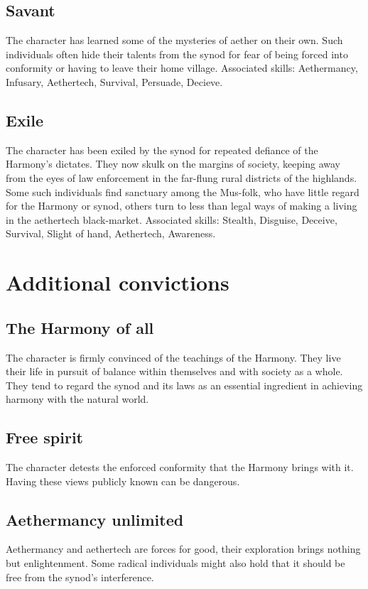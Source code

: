 \documentclass[a4paper,11pt,oneside]{book}
\begin{document}
\subsection{Savant}
The character has learned some of the mysteries of aether on their own. Such individuals often hide their talents from the synod for fear of being forced into conformity or having to leave their home village. Associated skills: Aethermancy, Infusary, Aethertech, Survival, Persuade, Decieve. 

\subsection{Exile}
The character has been exiled by the synod for repeated defiance of the Harmony's dictates. They now skulk on the margins of society, keeping away from the eyes of law enforcement in the far-flung rural districts of the highlands. Some such individuals find sanctuary among the Mus-folk, who have little regard for the Harmony or synod, others turn to less than legal ways of making a living in the aethertech black-market. Associated skills: Stealth, Disguise, Deceive, Survival, Slight of hand, Aethertech, Awareness.   


\section{Additional convictions}

\subsection{The Harmony of all}
The character is firmly convinced of the teachings of the Harmony. They live their life in pursuit of balance within themselves and with society as a whole. They tend to regard the synod and its laws as an essential ingredient in achieving harmony with the natural world.

\subsection{Free spirit}
The character detests the enforced conformity that the Harmony brings with it. Having these views publicly known can be dangerous. 

\subsection{Aethermancy unlimited}
Aethermancy and aethertech are forces for good, their exploration brings nothing but enlightenment. Some radical individuals might also hold that it should be free from the synod's interference. 
\end{document}
